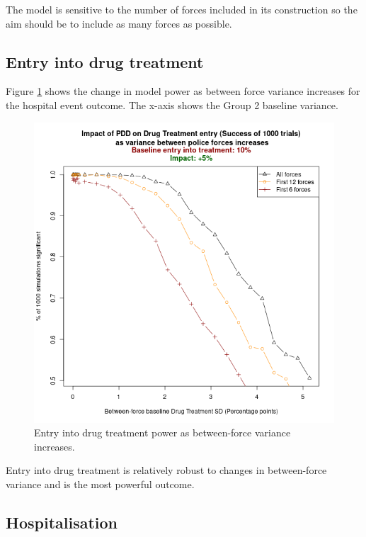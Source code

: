 \documentclass[
]{article}
\begin{document}
The model is sensitive to the number of forces included in its construction so the aim should be to include as many forces as possible.

\hypertarget{entry-into-drug-treatment}{%
\subsection{Entry into drug treatment}\label{entry-into-drug-treatment}}

Figure \ref{fig:rehabPower} shows the change in model power as between force variance increases for the hospital event outcome. The x-axis shows the Group 2 baseline variance.

\begin{figure}

{\centering \includegraphics[width=0.8\linewidth]{figures/rehab_vs_pf_original} 

}

\caption{Entry into drug treatment power as between-force variance increases.}\label{fig:rehabPower}
\end{figure}

Entry into drug treatment is relatively robust to changes in between-force variance and is the most powerful outcome.

\hypertarget{hospitalisation}{%
\subsection{Hospitalisation}\label{hospitalisation}}
\end{document}
